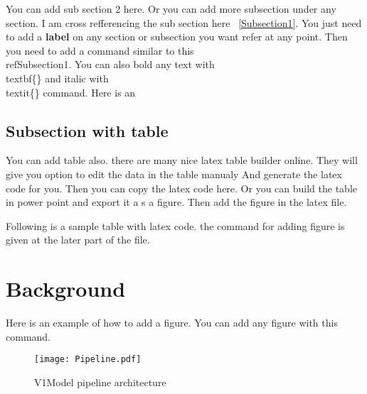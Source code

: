 You can add sub section 2 here. Or you can add more subsection under any section. I am cross 
refferencing the sub section here ~\ref{Subsection1}. You just need to add a \textbf{label} on any section or subsection you want 
refer at any point. Then you need to add a command similar to this \~\\ref{Subsection1}. 
You can also bold any text with \\textbf\{\} and italic with \\textit\{\}  command. 
Here is an 

\subsection{Subsection with table}

You can add table also. there are many nice latex table builder online. They will give you option to edit the data in the table manualy 
And generate the latex code for you. Then you can copy the latex code here. Or you can build the table in power point and 
export  it a s a figure. Then add the figure in the latex file.

Following is a sample table with latex code. the command for adding figure is given at the later part of the file. 


\begin{table}[h]
\end{table}





\section{Background} \label{BackgroundSection} 


Here is an example of how to add a figure. You can add any figure with this command. 




\begin{figure}[h]
 \centering
 \texttt{[image: Pipeline.pdf]}
 \caption{ V1Model pipeline architecture}
 \label{fig:V1ModelArchitecture}
\end{figure}












